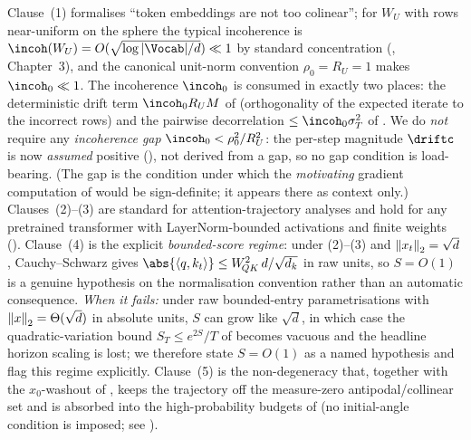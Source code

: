\begin{remark}[Realism, the (non-load-bearing) incoherence gap, and when $S=O(1)$ fails]
\label{rem:architecture_realism}
Clause~(1) formalises ``token embeddings are not too colinear''; for
$W_U$ with rows near-uniform on the sphere the typical incoherence is
$\incoh(W_U)=O(\sqrt{\log|\Vocab|/d})\ll1$ by standard concentration
(\cite{vershynin2018}, Chapter~3), and the canonical unit-norm convention
$\rho_0=R_U=1$ makes $\incoh_0\ll1$. The incoherence $\incoh_0$ is consumed
in exactly two places: the deterministic drift term $\incoh_0 R_U M$ of
 (orthogonality of the expected iterate to the
incorrect rows) and the pairwise decorrelation $\le\incoh_0\sigma_T^2$ of
. We do \emph{not} require any
\emph{incoherence gap} $\incoh_0<\rho_0^2/R_U^2$: the per-step magnitude
$\driftc$ is now \emph{assumed} positive (), not derived
from a gap, so no gap condition is load-bearing. (The gap is the condition
under which the \emph{motivating} gradient computation of
 would be sign-definite; it appears there as
context only.) Clauses~(2)--(3) are standard for attention-trajectory
analyses and hold for any pretrained transformer with LayerNorm-bounded
activations and finite weights (\cite{vaswani2017attention}). Clause~(4) is
the explicit \emph{bounded-score regime}: under (2)--(3) and
$\left\| x_t \right\|_2=\sqrt d$, Cauchy--Schwarz gives
$\abs{\inner{q}{k_t}}\le W_{\!QK}^2\,d/\sqrt{d_k}$ in raw units, so
$S=O(1)$ is a genuine hypothesis on the normalisation convention rather
than an automatic consequence. \emph{When it fails:} under raw
bounded-entry parametrisations with $\left\| x \right\|_2=\Theta(\sqrt d)$ in
absolute units, $S$ can grow like $\sqrt d$, in which case the
quadratic-variation bound $S_T\le e^{2S}/T$ of 
becomes vacuous and the headline horizon scaling is lost; we therefore
state $S=O(1)$ as a named hypothesis and flag this regime explicitly.
Clause~(5) is the non-degeneracy that, together with the $x_0$-washout of
, keeps the trajectory off the measure-zero
antipodal/collinear set and is absorbed into the high-probability budgets
of  (no initial-angle condition is
imposed; see ).
\end{remark}

